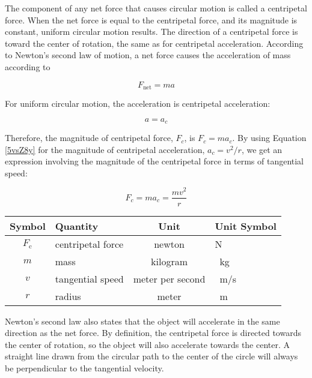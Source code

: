 \documentclass[main.tex]{subfiles}
\begin{document}
\vspace{1em}

The component of any net force that causes circular motion is called a \gls{centripetal force}. When the net force is equal to the centripetal force, and its magnitude is constant, uniform circular motion results. The direction of a centripetal force is toward the center of rotation, the same as for centripetal acceleration. According to Newton's second law of motion, a net force causes the acceleration of mass according to 

\begin{equation*}
    F_{\text{net}} = ma
\end{equation*}

For uniform circular motion, the acceleration is centripetal acceleration: 

\begin{equation*}
    a = a_c
\end{equation*}

Therefore, the magnitude of centripetal force, $F_c$, is $F_c = m a_c$. By using Equation \eqref{5vsZ8y} for the magnitude of centripetal acceleration, $a_c = v^2/r$, we get an expression involving the magnitude of the centripetal force in terms of tangential speed:

\begin{equation} \label{4H9EJq}
    F_c = m a_c = \frac{m v^2}{r}
\end{equation}

\begin{center}
    \begin{tabular}{cl|cl}
    \hline
    \textbf{Symbol} & \textbf{Quantity} & \textbf{Unit} & \textbf{Unit Symbol}  \\
    \hline\hline
    \rule{0pt}{2.5ex}
        $F_{\text{c}}$ & centripetal force & newton & N\\
        $m$ & mass & kilogram & \SI{}{kg}\\
        $v$ & tangential speed & meter per second & \SI{}{m/s} \\
        $r$ & radius & meter & \SI{}{m}\\
    \hline
    \end{tabular}
\end{center}

Newton's second law also states that the object will accelerate in the same direction as the net force. By definition, the centripetal force is directed towards the center of rotation, so the object will also accelerate towards the center. A straight line drawn from the circular path to the center of the circle will always be perpendicular to the tangential velocity. 
\end{document}
